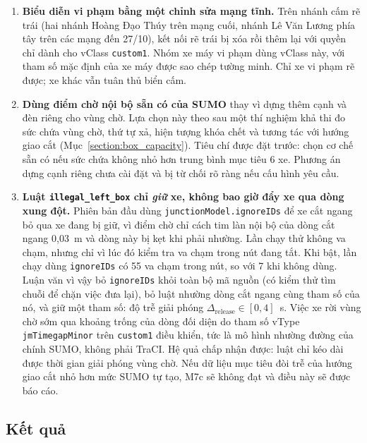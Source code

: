 \documentclass[../DoAn.tex]{subfiles}
\begin{document}
\begin{enumerate}[label=(\arabic*)]
    \item \textbf{Biểu diễn vi phạm bằng một chỉnh sửa mạng tĩnh.} Trên nhánh cấm rẽ trái (hai nhánh Hoàng Đạo Thúy trên mạng cuối, nhánh Lê Văn Lương phía tây trên các mạng đến 27/10), kết nối rẽ trái bị xóa rồi thêm lại với quyền chỉ dành cho vClass \texttt{custom1}. Nhóm xe máy vi phạm dùng vClass này, với tham số mặc định của xe máy được sao chép tường minh. Chỉ xe vi phạm rẽ được; xe khác vẫn tuân thủ biển cấm.
    \item \textbf{Dùng điểm chờ nội bộ sẵn có của SUMO} thay vì dựng thêm cạnh và đèn riêng cho vùng chờ. Lựa chọn này theo sau một thí nghiệm khả thi đo sức chứa vùng chờ, thứ tự xả, hiện tượng khóa chết và tương tác với hướng giao cắt (Mục~\ref{section:box_capacity}). Tiêu chí được đặt trước: chọn cơ chế sẵn có nếu sức chứa không nhỏ hơn trung bình mục tiêu 6 xe. Phương án dựng cạnh riêng chưa cài đặt và bị từ chối rõ ràng nếu cấu hình yêu cầu.
    \item \textbf{Luật \texttt{illegal\_left\_box} chỉ \emph{giữ} xe, không bao giờ đẩy xe qua dòng xung đột.} Phiên bản đầu dùng \texttt{junctionModel.ignoreIDs} để xe cắt ngang bỏ qua xe đang bị giữ, vì điểm chờ chỉ cách tim làn nội bộ của dòng cắt ngang 0,03~m và dòng này bị kẹt khi phải nhường. Lần chạy thử không va chạm, nhưng chỉ vì lúc đó kiểm tra va chạm trong nút đang tắt. Khi bật, lần chạy dùng \texttt{ignoreIDs} có 55 va chạm trong nút, so với 7 khi không dùng. Luận văn vì vậy bỏ \texttt{ignoreIDs} khỏi toàn bộ mã nguồn (có kiểm thử tìm chuỗi để chặn việc đưa lại), bỏ luật nhường dòng cắt ngang cùng tham số của nó, và giữ một tham số: độ trễ giải phóng $\Delta_{\text{release}} \in [0,4]$~s. Việc xe rời vùng chờ sớm qua khoảng trống của dòng đối diện do tham số vType \texttt{jmTimegapMinor} trên \texttt{custom1} điều khiển, tức là mô hình nhường đường của chính SUMO, không phải TraCI. Hệ quả chấp nhận được: luật chỉ kéo dài được thời gian giải phóng vùng chờ. Nếu dữ liệu mục tiêu đòi trễ của hướng giao cắt nhỏ hơn mức SUMO tự tạo, M7c sẽ không đạt và điều này sẽ được báo cáo.
\end{enumerate}

\subsection{Kết quả}
\end{document}
